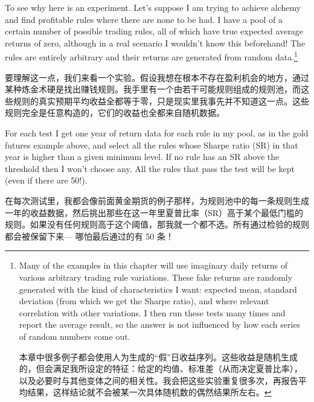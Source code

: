 \begin{englishblock} To see why here is an experiment. Let's suppose I am trying to achieve alchemy and find profitable rules where there are none to be had. I have a pool of a certain number of possible trading rules, all of which have true expected average returns of zero, although in a real scenario I wouldn't know this beforehand! The rules are entirely arbitrary and their returns are generated from random data.\footnote{Many of the examples in this chapter will use imaginary daily returns of various arbitrary trading rule variations. These fake returns are randomly generated with the kind of characteristics I want: expected mean, standard deviation (from which we get the Sharpe ratio), and where relevant correlation with other variations. I then run these tests many times and report the average result, so the answer is not influenced by how each series of random numbers come out. \par 本章中很多例子都会使用人为生成的“假”日收益序列。这些收益是随机生成的，但会满足我所设定的特征：给定的均值、标准差（从而决定夏普比率），以及必要时与其他变体之间的相关性。我会把这些实验重复很多次，再报告平均结果，这样结论就不会被某一次具体随机数的偶然结果所左右。}\end{englishblock}

\begin{chineseblock}要理解这一点，我们来看一个实验。假设我想在根本不存在盈利机会的地方，通过某种炼金术硬是找出赚钱规则。我手里有一个由若干可能规则组成的规则池，而这些规则的真实预期平均收益全都等于零，只是现实里我事先并不知道这一点。这些规则完全是任意构造的，它们的收益也全都来自随机数据。\end{chineseblock}

\bipairgap

\begin{englishblock} For each test I get one year of return data for each rule in my pool, as in the gold futures example above, and select all the rules whose Sharpe ratio (SR) in that year is higher than a given minimum level. If no rule has an SR above the threshold then I won't choose any. All the rules that pass the test will be kept (even if there are 50!). \end{englishblock}

\begin{chineseblock}在每次测试里，我都会像前面黄金期货的例子那样，为规则池中的每一条规则生成一年的收益数据，然后挑出那些在这一年里夏普比率（SR）高于某个最低门槛的规则。如果没有任何规则高于这个阈值，那我就一个都不选。所有通过检验的规则都会被保留下来--- 哪怕最后通过的有 50 条！\end{chineseblock}

